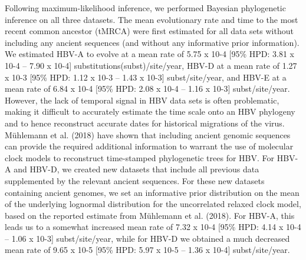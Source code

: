 Following maximum-likelihood inference, we performed Bayesian phylogenetic inference on all three datasets. The mean evolutionary rate and time to the most recent common ancestor (tMRCA) were first estimated for all data sets without including any ancient sequences (and without any informative prior information). We estimated HBV-A to evolve at a mean rate of 5.75 x 10-4 [95\% HPD: 3.81 x 10-4 – 7.90 x 10-4] substitutions(subst)/site/year, HBV-D at a mean rate of 1.27 x 10-3 [95\% HPD: 1.12 x 10-3 – 1.43 x 10-3] subst/site/year, and HBV-E at a mean rate of 6.84 x 10-4 [95\% HPD: 2.08 x 10-4 – 1.16 x 10-3] subst/site/year. However, the lack of temporal signal in HBV data sets is often problematic, making it difficult to accurately estimate the time scale onto an HBV phylogeny and to hence reconstruct accurate dates for historical migrations of the virus. Mühlemann et al. (2018) have shown that including ancient genomic sequences can provide the required additional information to warrant the use of molecular clock models to reconstruct time-stamped phylogenetic trees for HBV. For HBV-A and HBV-D, we created new datasets that include all previous data supplemented by the relevant ancient sequences. For these new datasets containing ancient genomes, we set an informative prior distribution on the mean of the underlying lognormal distribution for the uncorrelated relaxed clock model, based on the reported estimate from Mühlemann et al. (2018). For HBV-A, this leads us to a somewhat increased mean rate of 7.32 x 10-4 [95\% HPD: 4.14 x 10-4 – 1.06 x 10-3] subst/site/year, while for HBV-D we obtained a much decreased mean rate of 9.65 x 10-5 [95\% HPD: 5.97 x 10-5 – 1.36 x 10-4] subst/site/year.

